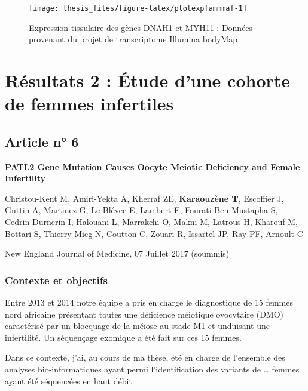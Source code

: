 \documentclass[12pt,twoside]{reedthesis}
\theoremstyle{definition}
\theoremstyle{definition}
\theoremstyle{remark}
\begin{document}
  \newpage
  
  \begin{figure}
  
  {\centering \texttt{[image: thesis\_files/figure-latex/plotexpfammmaf-1]} 
  
  }
  
  \caption[Expression tissulaire des gènes DNAH1 et MYH11]{Expression tissulaire des gènes DNAH1 et MYH11 : Données provenant du projet de transcriptome Illumina bodyMap}\label{fig:plotexpfammmaf}
  \end{figure}
  
  \newpage
  
  \section{Résultats 2 : Étude d'une cohorte de femmes
  infertiles}\label{resultats-2-etude-dune-cohorte-de-femmes-infertiles}
  
  \subsection{Article n° 6}\label{article-n-6}
  
  \textbf{PATL2 Gene Mutation Causes Oocyte Meiotic Deficiency and Female
  Infertility}
  
  Christou-Kent M, Amiri-Yekta A, Kherraf ZE, \textbf{Karaouzène T},
  Escoffier J, Guttin A, Martinez G, Le Blévec E, Lambert E, Fourati Ben
  Mustapha S, Cedrin-Durnerin I, Halouani L, Marrakchi O, Makni M, Latrous
  H, Kharouf M, Bottari S, Thierry-Mieg N, Coutton C, Zouari R, Issartel
  JP, Ray PF, Arnoult C
  
  New England Journal of Medicine, 07 Juillet 2017 (soummis)
  
  \newpage
  
  \subsubsection{Contexte et objectifs}\label{contexte-et-objectifs-3}
  
  Entre 2013 et 2014 notre équipe a pris en charge le diagnostique de 15
  femmes nord africaine présentant toutes une déficience méiotique
  ovocytaire (DMO) caractérisé par un blocquage de la méïose au stade M1
  et unduisant une infertilité. Un séquençage exomique a été fait sur ces
  15 femmes.
  
  Dans ce contexte, j'ai, au cours de ma thèse, été en charge de
  l'ensemble des analyses bio-informatiques ayant permi l'identification
  des variants de \ldots{} femmes ayant été séquencées en haut débit.
  
\end{document}
